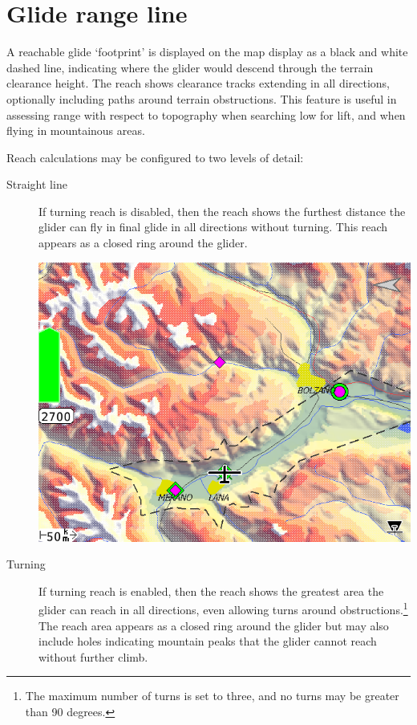 \section{Glide range line}\label{sec:reach}

A reachable glide `footprint' is displayed on the map display as a
black and white dashed line, indicating where the glider would descend
through the terrain clearance height.  The reach shows clearance
tracks extending in all directions, optionally including paths around
terrain obstructions.  This feature is useful in assessing range with
respect to topography when searching low for lift, and when flying in
mountainous areas.

Reach calculations may be configured  to two levels of detail:
\begin{description}
\item[Straight line] If turning reach is disabled, then the reach shows the
 furthest distance the glider can fly in final glide in all directions without
 turning.  This reach appears as a closed ring around the glider.

\begin{center}
\includegraphics[angle=0,width=0.8\linewidth,keepaspectratio='true']{figures/reach1.png}
\end{center}

\item[Turning] If turning reach is enabled, then the reach shows the
  greatest area the glider can reach in all directions, even allowing
  turns around obstructions.\footnote{The maximum number of turns is
    set to three, and no turns may be greater than 90 degrees.}  The
  reach area appears as a closed ring around the glider but may also
  include holes indicating mountain peaks that the glider cannot reach
  without further climb.


\end{description}
